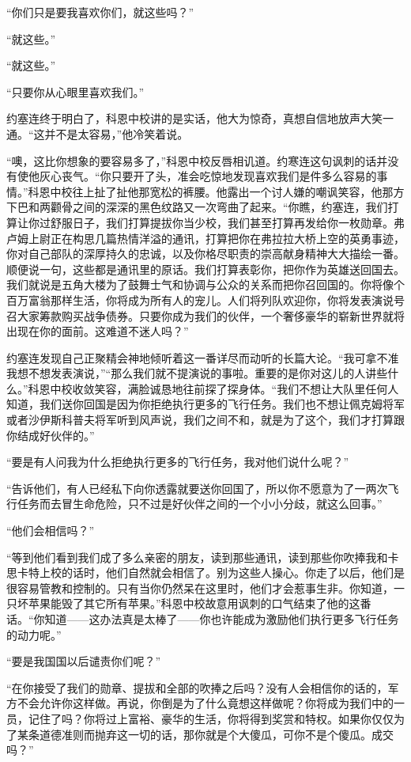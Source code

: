     “你们只是要我喜欢你们，就这些吗？”

    “就这些。”

    “就这些。”

    “只要你从心眼里喜欢我们。”

    约塞连终于明白了，科恩中校讲的是实话，他大为惊奇，真想自信地放声大笑一通。“这并不是太容易，”他冷笑着说。

    “噢，这比你想象的要容易多了，”科恩中校反唇相讥道。约寒连这句讽刺的话并没有使他灰心丧气。“你只要开了头，准会吃惊地发现喜欢我们是件多么容易的事情。”科恩中校往上扯了扯他那宽松的裤腰。他露出一个讨人嫌的嘲讽笑容，他那方下巴和两颧骨之间的深深的黑色纹路又一次弯曲了起来。“你瞧，约塞连，我们打算让你过舒服日子，我们打算提拔你当少校，我们甚至打算再发给你一枚勋章。弗卢姆上尉正在构思几篇热情洋溢的通讯，打算把你在弗拉拉大桥上空的英勇事迹，你对自己部队的深厚持久的忠诚，以及你格尽职责的崇高献身精神大大描绘一番。顺便说一句，这些都是通讯里的原话。我们打算表彰你，把你作为英雄送回国去。我们就说是五角大楼为了鼓舞士气和协调与公众的关系而把你召回国的。你将像个百万富翁那样生活，你将成为所有人的宠儿。人们将列队欢迎你，你将发表演说号召大家筹款购买战争债券。只要你成为我们的伙伴，一个奢侈豪华的崭新世界就将出现在你的面前。这难道不迷人吗？”
 


    约塞连发现自己正聚精会神地倾听着这一番详尽而动听的长篇大论。“我可拿不准我想不想发表演说，”“那么我们就不提演说的事啦。重要的是你对这儿的人讲些什么。”科恩中校收敛笑容，满脸诚恳地往前探了探身体。“我们不想让大队里任何人知道，我们送你回国是因为你拒绝执行更多的飞行任务。我们也不想让佩克姆将军或者沙伊斯科普夫将军听到风声说，我们之间不和，就是为了这个，我们才打算跟你结成好伙伴的。”

    “要是有人问我为什么拒绝执行更多的飞行任务，我对他们说什么呢？”

    “告诉他们，有人已经私下向你透露就要送你回国了，所以你不愿意为了一两次飞行任务而去冒生命危险，只不过是好伙伴之间的一个小小分歧，就这么回事。”

    “他们会相信吗？”

    “等到他们看到我们成了多么亲密的朋友，读到那些通讯，读到那些你吹捧我和卡思卡特上校的话时，他们自然就会相信了。别为这些人操心。你走了以后，他们是很容易管教和控制的。只有当你仍然呆在这里时，他们才会惹事生非。你知道，一只坏苹果能毁了其它所有苹果。”科恩中校故意用讽刺的口气结束了他的这番话。“你知道——这办法真是太棒了——你也许能成为激励他们执行更多飞行任务的动力呢。”

    “要是我国国以后谴责你们呢？”

    “在你接受了我们的勋章、提拔和全部的吹捧之后吗？没有人会相信你的话的，军方不会允许你这样做。再说，你倒是为了什么竟想这样做呢？你将成为我们中的一员，记住了吗？你将过上富裕、豪华的生活，你将得到奖赏和特权。如果你仅仅为了某条道德准则而抛弃这一切的话，那你就是个大傻瓜，可你不是个傻瓜。成交吗？”


